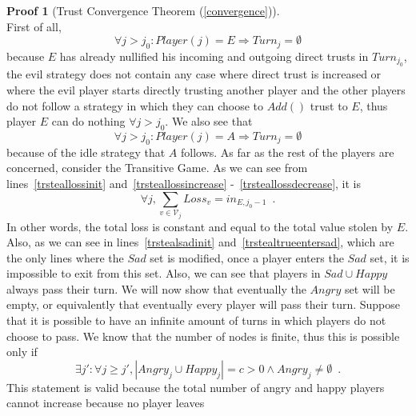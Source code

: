 \documentclass[11pt]{llncs}
\theoremstyle{definition}
\newtheorem*{sepproof}{Proof}
\begin{document}
    \begin{sepproof}[Trust Convergence Theorem (\ref{convergence})] \ \\
    \label{convergenceproof}
       First of all,
       \begin{equation*}
          \forall j > j_0 : Player\left(j\right) = E \Rightarrow Turn_j = \emptyset
       \end{equation*}
        because $E$ has already nullified his incoming and outgoing direct trusts in $Turn_{j_0}$, the evil strategy does not
       contain any case where direct trust is increased or where the evil player starts directly trusting another player and
       the other players do not follow a strategy in which they can choose to $Add\left(\right)$ trust to $E$, thus player
       $E$ can do nothing $\forall j > j_0$. We also see that
       \begin{equation*}
          \forall j > j_0 : Player(j) = A \Rightarrow Turn_j = \emptyset
       \end{equation*}
       because of the idle strategy that $A$ follows. As far as the rest of the players are concerned, consider the
       Transitive Game. As we can see from lines~\ref{trsteallossinit} and~\ref{trsteallossincrease}
       -~\ref{trsteallossdecrease}, it is
       \begin{equation*}
          \forall j, \sum\limits_{v \in \mathcal{V}_j}Loss_v = in_{E, j_0-1} \enspace.
       \end{equation*}
       In other words, the total loss is constant and equal to the total value stolen by $E$. Also, as we can see in
       lines~\ref{trstealsadinit} and~\ref{trstealtrueentersad}, which are the only lines where the $Sad$ set is modified,
       once a player enters the $Sad$ set, it is impossible to exit from this set. Also, we can see that players in $Sad
       \cup Happy$ always pass their turn. We will now show that eventually the $Angry$ set will be empty, or equivalently
       that eventually every player will pass their turn. Suppose that it is possible to have an infinite amount of turns
       in which players do not choose to pass. We know that the number of nodes is finite, thus this is possible only if
       \begin{equation*}
          \exists j': \forall j \geq j', |Angry_j \cup Happy_j| = c > 0 \wedge Angry_j \neq \emptyset \enspace.
       \end{equation*}
       This statement is valid because the total number of angry and happy players cannot increase because no player leaves

\end{sepproof}
\end{document}
